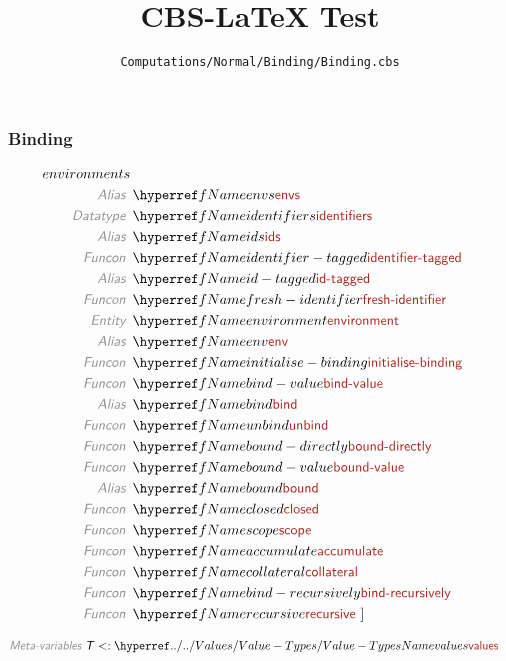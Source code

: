 \documentclass[fleqn]{article}
\title{CBS-LaTeX Test}
\author{\nolinkurl{Computations/Normal/Binding/Binding.cbs}}
\begin{document}
\maketitle

\subsubsection*{Binding}


\begin{align*}
 [ ~ 
 \KEY{Type} ~ & \NAME[\REF]{environments} \\
 \KEY{Alias} ~ & \NAME[\REF]{envs} \\
 \KEY{Datatype} ~ & \NAME[\REF]{identifiers} \\
 \KEY{Alias} ~ & \NAME[\REF]{ids} \\
 \KEY{Funcon} ~ & \NAME[\REF]{identifier-tagged} \\
 \KEY{Alias} ~ & \NAME[\REF]{id-tagged} \\
 \KEY{Funcon} ~ & \NAME[\REF]{fresh-identifier} \\
 \KEY{Entity} ~ & \NAME[\REF]{environment} \\
 \KEY{Alias} ~ & \NAME[\REF]{env} \\
 \KEY{Funcon} ~ & \NAME[\REF]{initialise-binding} \\
 \KEY{Funcon} ~ & \NAME[\REF]{bind-value} \\
 \KEY{Alias} ~ & \NAME[\REF]{bind} \\
 \KEY{Funcon} ~ & \NAME[\REF]{unbind} \\
 \KEY{Funcon} ~ & \NAME[\REF]{bound-directly} \\
 \KEY{Funcon} ~ & \NAME[\REF]{bound-value} \\
 \KEY{Alias} ~ & \NAME[\REF]{bound} \\
 \KEY{Funcon} ~ & \NAME[\REF]{closed} \\
 \KEY{Funcon} ~ & \NAME[\REF]{scope} \\
 \KEY{Funcon} ~ & \NAME[\REF]{accumulate} \\
 \KEY{Funcon} ~ & \NAME[\REF]{collateral} \\
 \KEY{Funcon} ~ & \NAME[\REF]{bind-recursively} \\
 \KEY{Funcon} ~ & \NAME[\REF]{recursive}
  ~ ]
\end{align*}

\begin{align*}
  \KEY{Meta-variables} ~ 
  & \VAR{T} <: \NAME[\HYPER{../../Values}{Value-Types}]{values}
\end{align*}
\end{document}
